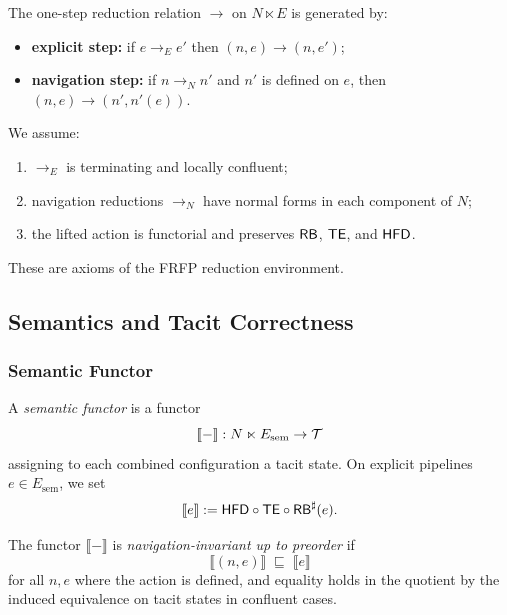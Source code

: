 \begin{definition}
The one-step reduction relation \(\to\) on \(N \ltimes E\) is generated by:
\begin{itemize}
  \item \textbf{explicit step:}
        if \(e \to_E e'\) then \((n, e) \to (n, e')\);
  \item \textbf{navigation step:}
        if \(n \to_N n'\) and \(n'\) is defined on \(e\), then
        \((n, e) \to (n', n'(e))\).
\end{itemize}
We assume:
\begin{enumerate}[label=(A\arabic*)]
  \item \(\to_E\) is terminating and locally confluent;
  \item navigation reductions \(\to_N\) have normal forms in each component
        of \(N\);
  \item the lifted action is functorial and preserves \(\mathsf{RB}\), \(\mathsf{TE}\),
        and \(\mathsf{HFD}\).
\end{enumerate}
These are axioms of the FRFP reduction environment.
\end{definition}

\subsection{Semantics and Tacit Correctness}

\subsubsection{Semantic Functor}

\begin{definition}
A \emph{semantic functor} is a functor
\[
\llbracket{-}\rrbracket : N \ltimes E_{\mathrm{sem}} \to \mathcal{T}
\]
assigning to each combined configuration a tacit state.
On explicit pipelines \(e \in E_{\mathrm{sem}}\), we set
\[
\llbracket e \rrbracket := \mathsf{HFD} \circ \mathsf{TE} \circ \mathsf{RB}^{\sharp}(e).
\]
\end{definition}

\begin{definition}
The functor \(\llbracket{-}\rrbracket\) is \emph{navigation-invariant up to
preorder} if
\[
\llbracket (n, e) \rrbracket \;\sqsubseteq\; \llbracket e \rrbracket
\]
for all \(n,e\) where the action is defined, and equality holds in the
quotient by the induced equivalence on tacit states in confluent cases.
\end{definition}

